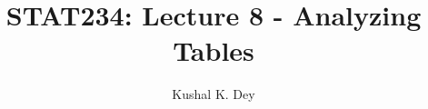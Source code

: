\documentclass{beamer}\usepackage[]{graphicx}\usepackage[]{color}
\title{STAT234: Lecture 8 - Analyzing Tables}
\author{Kushal K. Dey}
\date{}
\begin{document}





\begin{frame}{}
\maketitle
\end{frame}

\end{document}
